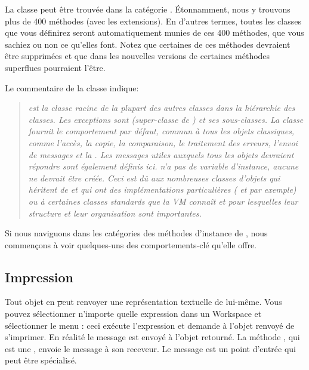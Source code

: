 \documentclass[a4paper,10pt,twoside]{book}
\begin{document}
La classe  peut être trouvée dans la catégorie
. Étonnamment, nous y trouvons plus de 400
méthodes (avec les extensions). En d'autres termes, toutes les
classes que vous définirez seront automatiquement munies de ces 400
méthodes, que vous sachiez ou non ce qu'elles font.
Notez que certaines de ces méthodes devraient être supprimées et
que dans les nouvelles versions de \pharo certaines méthodes superflues
pourraient l'être.

Le commentaire de la classe  indique:
\begin{quote}
\textit{ est la classe racine de la plupart des autres classes dans 
la hiérarchie des classes. Les exceptions sont  (super-classe de ) 
et ses sous-classes. La classe  fournit le comportement par défaut, commun à tous 
les objets classiques, comme l'accès, la copie, la comparaison, le traitement des erreurs, 
l'envoi de messages et la . Les messages utiles auxquels tous les objets 
devraient répondre sont également définis ici.
 n'a pas de variable d'instance, aucune ne devrait être
créée. Ceci est dû aux nombreuses classes d'objets qui
héritent de  et qui ont des implémentations
particulières ( et  par
exemple) ou à certaines classes standards que la VM connaît et
pour lesquelles leur structure et leur organisation sont importantes.}
\end{quote}

Si nous naviguons dans les catégories des méthodes d'instance de , nous commençons 
à voir quelques-uns des comportements-clé qu'elle offre.

\subsection{Impression}
Tout objet en \st peut renvoyer une représentation textuelle de lui-même. Vous pouvez sélectionner 
n'importe quelle expression dans un Workspace et sélectionner le menu : 
ceci exécute l'expression et demande à l'objet renvoyé de s'imprimer. En réalité le 
message  est envoyé à l'objet retourné. La méthode , 
qui est une , envoie le message  à son receveur. 
Le message  est un point d'entrée qui peut être spécialisé. 
\end{document}
